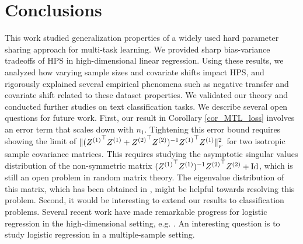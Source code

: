\section{Conclusions}\label{sec_conclude}

This work studied generalization properties of a widely used hard parameter sharing approach for multi-task learning.
We provided sharp bias-variance tradeoffs of HPS in high-dimensional linear regression.
Using these results, we analyzed how varying sample sizes and covariate shifts impact HPS, and rigorously explained several empirical phenomena such as negative transfer and covariate shift related to these dataset properties.
We validated our theory and conducted further studies on text classification tasks.
We describe several open questions for future work.
First, our result in Corollary \ref{cor_MTL_loss} involves an error term that scales down with $n_1$.
Tightening this error bound requires showing the limit of $\|({Z^{(1)}}^{\top} Z^{(1)} + {Z^{(2)}}^{\top} Z^{(2)})^{-1} {Z^{(1)}}^{\top} Z^{(1)}\|_{_{F}}^2$ for two isotropic sample covariance matrices.
This requires studying the asymptotic singular values distribution of the non-symmetric matrix $({Z^{(1)}}^{\top} Z^{(1)})^{-1}{Z^{(2)}}^{\top} Z^{(2)}+\operatorname{Id}$, which is still an open problem in random matrix theory.
The eigenvalue distribution of this matrix, which has been obtained in \cite{Fmatrix}, might be helpful towards resolving this problem.
Second, it would be interesting to extend our results to classification problems.
Several recent work have made remarkable progress for logistic regression in the high-dimensional setting, e.g. \cite{sur2019modern}.
An interesting question is to study logistic regression in a multiple-sample setting.


